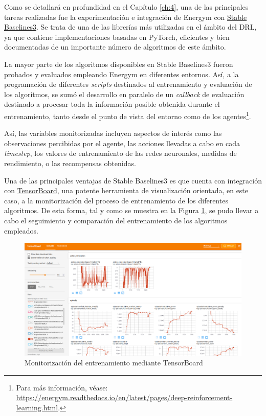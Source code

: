 Como se detallará en profundidad en el Capítulo \ref{ch:4}, una de las principales tareas realizadas fue la experimentación e integración de Energym con \href{https://stable-baselines3.readthedocs.io}{Stable Baselines3}. Se trata de una de las librerías más utilizadas en el ámbito del DRL, ya que contiene implementaciones basadas en PyTorch, eficientes y bien documentadas de un importante número de algoritmos de este ámbito. 

La mayor parte de los algoritmos disponibles en Stable Baselines3 fueron probados y evaluados empleando Energym en diferentes entornos. Así, a la programación de diferentes \textit{scripts} destinados al entrenamiento y evaluación de los algoritmos, se sumó el desarrollo en paralelo de un \textit{callback} de evaluación destinado a procesar toda la información posible obtenida durante el entrenamiento, tanto desde el punto de vista del entorno como de los agentes\footnote{Para más información, véase:  \url{https://energym.readthedocs.io/en/latest/pages/deep-reinforcement-learning.html}.}. 

Así, las variables monitorizadas incluyen aspectos de interés como las observaciones percibidas por el agente, las acciones llevadas a cabo en cada \textit{timestep}, los valores de entrenamiento de las redes neuronales, medidas de rendimiento, o las recompensas obtenidas.

Una de las principales ventajas de Stable Baselines3 es que cuenta con integración con \href{https://www.tensorflow.org/tensorboard}{TensorBoard}, una potente herramienta de visualización orientada, en este caso, a la monitorización del proceso de entrenamiento de los diferentes algoritmos. De esta forma, tal y como se muestra en la Figura \ref{fig:tensorboard}, se pudo llevar a cabo el seguimiento y comparación del entrenamiento de los algoritmos empleados.

\begin{figure}
    \centering
    \includegraphics[width=\textwidth]{imagenes/tensorboard.png}
    \caption{Monitorización del entrenamiento mediante TensorBoard}
    \label{fig:tensorboard}
\end{figure}

